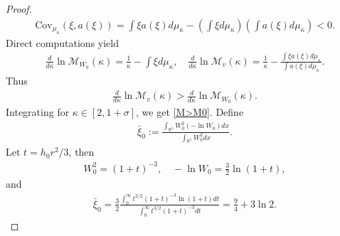 \documentclass{article}
\theoremstyle{definition} \theoremstyle{remark}
\numberwithin{equation}{section}
\newcommand{\R}{\mathbb{R}}
\begin{document}
\begin{proof}
		\begin{align*}
			\text{Cov}_{\mu_\kappa}(\xi,a(\xi)) = \int \xi a(\xi)d\mu_\kappa - \left(\int \xi d\mu_\kappa\right)\left(\int a(\xi) d\mu_\kappa\right) < 0.
		\end{align*}
		Direct computations yield
		\begin{align*}
			\frac{d}{d\kappa}\ln \mathcal{M}_{W_0}(\kappa) = \frac{1}{\kappa} - \int \xi d\mu_\kappa, \quad \frac{d}{d\kappa}\ln \mathcal{M}_{v}(\kappa) = \frac{1}{\kappa} - \frac{\int \xi a(\xi) d\mu_\kappa}{\int a(\xi) d\mu_\kappa}.
		\end{align*}
		Thus
		\begin{align*}
			\frac{d}{d\kappa}\ln \mathcal{M}_{v}(\kappa) > \frac{d}{d\kappa}\ln \mathcal{M}_{W_0}(\kappa).
		\end{align*}
		Integrating for $\kappa \in [2,1+\sigma]$, we get \eqref{M>M0}.  Define
		\begin{align*}
			\bar\xi_0 := \frac{\int_{\R^5}W_0^2(-\ln W_0)dx}{\int_{\R^5}W_0^2dx}.
		\end{align*}
		Let $t = h_0 r^2/3$, then
		\begin{align*}
			W_0^2 = (1+t)^{-3}, \quad -\ln W_0 = \frac{3}{2}\ln(1+t),
		\end{align*}
		and
		\begin{align*}
			\bar\xi_0 = \frac{3}{2}\frac{\int_0^\infty t^{3/2}(1+t)^{-3}\ln(1+t)dt}{\int_0^\infty t^{3/2}(1+t)^{-3}dt} = \frac{9}{4} + 3\ln 2.
		\end{align*}


\end{proof}
\end{document}
